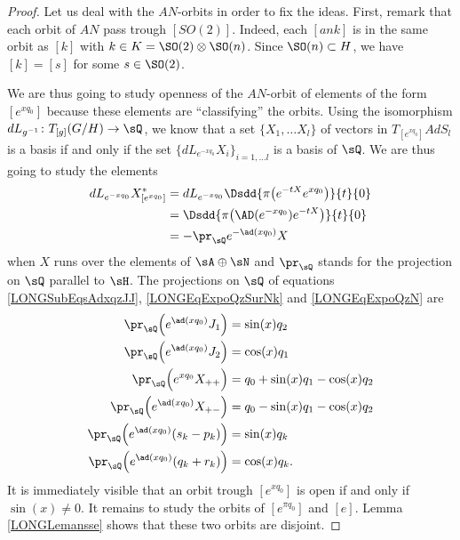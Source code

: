 \begin{proof}
    Let us deal with the $AN$-orbits in order to fix the ideas. First, remark that each orbit of $AN$ pass trough $[SO(2)]$. Indeed, each $[ank]$ is in the same orbit as $[k]$ with $k\in K=\SO(2)\otimes\SO(n)$. Since $\SO(n)\subset H$, we have $[k]=[s]$ for some $s\in\SO(2)$.

    We are thus going to study openness of the $AN$-orbit of elements of the form $[e^{x q_0}]$ because these elements are ``classifying'' the orbits. Using the isomorphism $  dL_{g^{-1}}\colon T_{[g]}(G/H)\to \sQ$, we know that a set $\{ X_1,\ldots X_l \}$ of vectors in $T_{[ e^{x q_0}]}AdS_l$ is a basis if and only if the set $\{ dL_{ e^{-xq_0}}X_i \}_{i=1,\ldots l}$ is a basis of $\sQ$. We are thus going to study the elements 
    \begin{equation}
        \begin{aligned}[]
            dL_{ e^{-xq_0}}X^*_{[ e^{xq_0}]}    &=dL_{ e^{-xq_0}}\Dsdd{ \pi\big(  e^{-t X} e^{xq_0} \big) }{t}{0}\\
                                &=\Dsdd{ \pi\big(  \AD( e^{-xq_0} ) e^{-tX} \big) }{t}{0}\\
                                &=-\pr_{\sQ} e^{-\ad(xq_0)}X
        \end{aligned}
    \end{equation}
    when $X$ runs over the elements of $\sA\oplus \sN$ and $\pr_{\sQ}$ stands for the projection on $\sQ$ parallel to $\sH$.
    The projections on $\sQ$ of equations \eqref{LONGSubEqsAdxqzJJ}, \eqref{LONGEqExpoQzSurNk} and \eqref{LONGEqExpoQzN} are
    \begin{subequations}        \label{LONGSubEqsExpAdxqDivers}
        \begin{align}
            \pr_{\sQ}\Big( e^{\ad(xq_0)}J_1\Big)&=\sin(x)q_2\\
            \pr_{\sQ}\Big( e^{\ad(xq_0)}J_2\Big)&=\cos(x)q_1\\
            \pr_{\sQ}\Big(  e^{xq_0}X_{++} \Big)&=q_0+\sin(x)q_1-\cos(x)q_2\\
            \pr_{\sQ} \Big(   e^{\ad(xq_0)}X_{+-} \Big)&=q_0-\sin(x)q_1-\cos(x)q_2\\
            \pr_{\sQ}\Big(  e^{\ad(xq_0)}(s_k-p_k) \Big)&= \sin(x)q_k\\
            \pr_{\sQ}\Big(  e^{\ad(xq_0)}(q_k+r_k) \Big)&=\cos(x)q_k.
        \end{align}
    \end{subequations}
    It is immediately visible
    that an orbit trough $[ e^{xq_0}]$ is open if and only if $\sin(x)\neq 0$. It remains to study the orbits of $[ e^{\pi q_0}]$ and $[e]$. Lemma \ref{LONGLemansse} shows that these two orbits are disjoint.


\end{proof}
